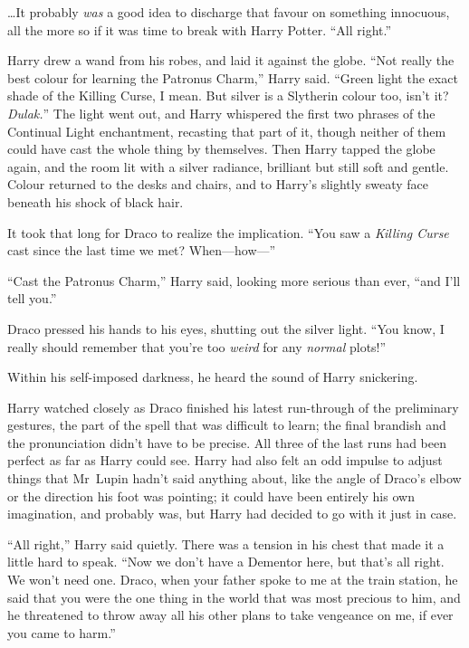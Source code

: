 …It probably \emph{was} a good idea to discharge that favour on something innocuous, all the more so if it was time to break with Harry Potter. “All right.”

Harry drew a wand from his robes, and laid it against the globe. “Not really the best colour for learning the Patronus Charm,” Harry said. “Green light the exact shade of the Killing Curse, I mean. But silver is a Slytherin colour too, isn’t it? \emph{Dulak.}” The light went out, and Harry whispered the first two phrases of the Continual Light enchantment, recasting that part of it, though neither of them could have cast the whole thing by themselves. Then Harry tapped the globe again, and the room lit with a silver radiance, brilliant but still soft and gentle. Colour returned to the desks and chairs, and to Harry’s slightly sweaty face beneath his shock of black hair.

It took that long for Draco to realize the implication. “You saw a \emph{Killing Curse} cast since the last time we met? When—how—”

“Cast the Patronus Charm,” Harry said, looking more serious than ever, “and I’ll tell you.”

Draco pressed his hands to his eyes, shutting out the silver light. “You know, I really should remember that you’re too \emph{weird} for any \emph{normal} plots!”

Within his self-imposed darkness, he heard the sound of Harry snickering.

\later

Harry watched closely as Draco finished his latest run-through of the preliminary gestures, the part of the spell that was difficult to learn; the final brandish and the pronunciation didn’t have to be precise. All three of the last runs had been perfect as far as Harry could see. Harry had also felt an odd impulse to adjust things that Mr~Lupin hadn’t said anything about, like the angle of Draco’s elbow or the direction his foot was pointing; it could have been entirely his own imagination, and probably was, but Harry had decided to go with it just in case.

“All right,” Harry said quietly. There was a tension in his chest that made it a little hard to speak. “Now we don’t have a Dementor here, but that’s all right. We won’t need one. Draco, when your father spoke to me at the train station, he said that you were the one thing in the world that was most precious to him, and he threatened to throw away all his other plans to take vengeance on me, if ever you came to harm.”

